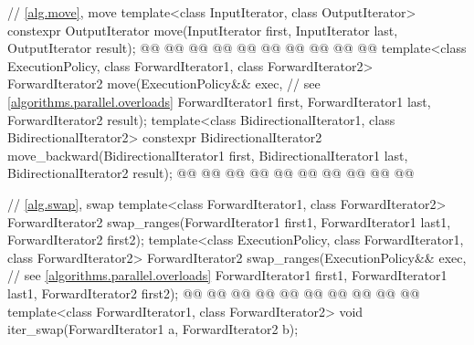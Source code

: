\begin{codeblock}
{  // \ref{alg.move}, move
  template<class InputIterator, class OutputIterator>
    constexpr OutputIterator move(InputIterator first, InputIterator last,
                                  OutputIterator result);
  @@
    @@
      @@
      @@
        @@
    @@
      @@
      @@
        @@
  @\added{\}}@
  template<class ExecutionPolicy, class ForwardIterator1,
           class ForwardIterator2>
    ForwardIterator2 move(ExecutionPolicy&& exec, // see \ref{algorithms.parallel.overloads}
                          ForwardIterator1 first, ForwardIterator1 last,
                          ForwardIterator2 result);
  template<class BidirectionalIterator1, class BidirectionalIterator2>
    constexpr BidirectionalIterator2
      move_backward(BidirectionalIterator1 first, BidirectionalIterator1 last,
                    BidirectionalIterator2 result);
  @@
    @@
      @@
      @@
        @@
    @@
      @@
      @@
        @@
  @\added{\}}@

  // \ref{alg.swap}, swap
  template<class ForwardIterator1, class ForwardIterator2>
    ForwardIterator2 swap_ranges(ForwardIterator1 first1, ForwardIterator1 last1,
                                 ForwardIterator2 first2);
  template<class ExecutionPolicy, class ForwardIterator1, class ForwardIterator2>
    ForwardIterator2 swap_ranges(ExecutionPolicy&& exec, // see \ref{algorithms.parallel.overloads}
                                 ForwardIterator1 first1, ForwardIterator1 last1,
                                 ForwardIterator2 first2);
  @@
    @@
      @@
      @@
        @@
    @@
      @@
      @@
        @@
  @\added{\}}@
  template<class ForwardIterator1, class ForwardIterator2>
    void iter_swap(ForwardIterator1 a, ForwardIterator2 b);

}
\end{codeblock}
